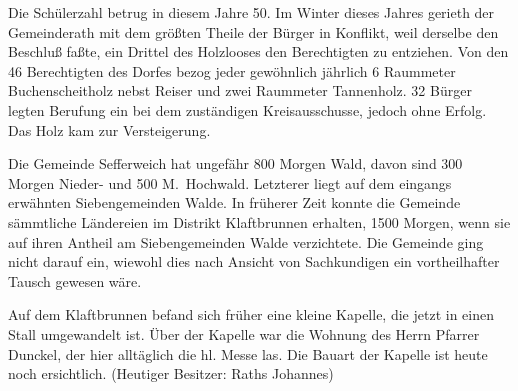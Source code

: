 

\pstart
Die Schülerzahl betrug in diesem Jahre 50.\ob
Im Winter dieses Jahres gerieth der Gemeinderath mit dem\ob
größten Theile der Bürger in Konflikt, weil derselbe den\ob
Beschluß faßte, ein Drittel des Holzlooses den Berechtigten\ob
zu entziehen. Von den 46 Berechtigten des Dorfes bezog\ob
{}%
jeder gewöhnlich jährlich 6 Raummeter Buchenscheitholz\ob
nebst Reiser und zwei Raummeter Tannenholz. 32\ob
Bürger legten Berufung ein bei dem zuständigen\ob
Kreisausschusse, jedoch ohne Erfolg. Das Holz kam zur\ob
Versteigerung.

Die Gemeinde Sefferweich hat ungefähr 800 Morgen Wald,\ob
davon sind 300 Morgen Nieder- und 500 M.\ Hochwald.\ob
Letzterer liegt auf dem eingangs erwähnten\ob
Siebengemeinden Walde. In früherer Zeit konnte die\ob
Gemeinde sämmtliche Ländereien im Distrikt Klaftbrunnen\ob
erhalten, 1500 Morgen, wenn sie auf ihren Antheil\ob
am Siebengemeinden Walde verzichtete. Die Gemeinde\ob
{}%
ging nicht darauf ein, wiewohl dies nach Ansicht\ob
von Sachkundigen ein vortheilhafter Tausch\ob
gewesen wäre.

Auf dem Klaftbrunnen befand sich früher eine kleine\ob
Kapelle, die jetzt in einen Stall umgewandelt ist. Über\ob
der Kapelle war die Wohnung des Herrn Pfarrer Dunckel\unsicher, der\ob
hier alltäglich die hl. Messe las. Die Bauart der Kapelle ist\ob
heute noch ersichtlich. (Heutiger Besitzer: Raths Johannes\unsicher)
\pend
